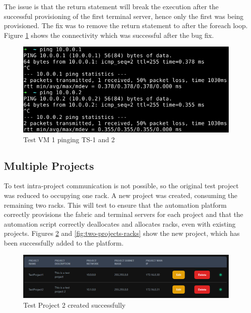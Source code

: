 The issue is that the return statement will break the execution after the successful provisioning of the first terminal server, hence only the first was being provisioned. The fix was to remove the return statement to after the foreach loop. Figure \ref{fig:terminal-server-ping} shows the connectivity which was successful after the bug fix.

\begin{figure}[H]
    \centering
    \includegraphics[scale=1.5]{images/terminal-server-ping.png}
    \caption{Test VM 1 pinging TS-1 and 2}
    \label{fig:terminal-server-ping}
\end{figure}

\subsection{Multiple Projects}
To test intra-project communication is not possible, so the original test project was reduced to occupying one rack. A new project was created, consuming the remaining two racks. This will test to ensure that the automation platform correctly provisions the fabric and terminal servers for each project and that the automation script correctly deallocates and allocates racks, even with existing projects. Figures \ref{fig:two-projects} and \ref{fig:two-projects-racks} show the new project, which has been successfully added to the platform.

\begin{figure}[H]
    \centering
    \includegraphics[scale=1]{images/two-projects.png}
    \caption{Test Project 2 created successfully}
    \label{fig:two-projects}
\end{figure}

